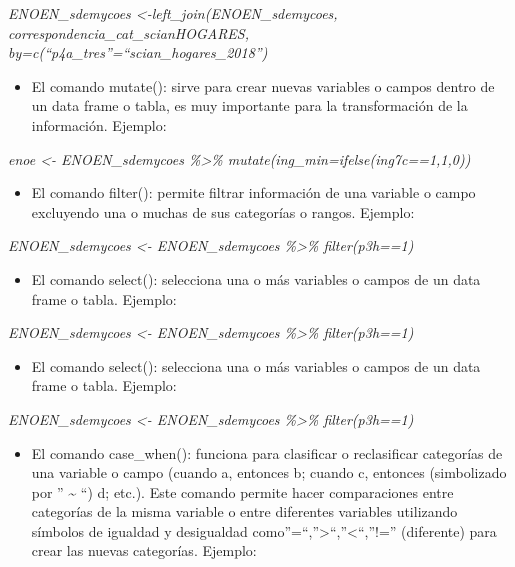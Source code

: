 \documentclass[
]{article}
\providecommand{\tightlist}{%
  \setlength{\itemsep}{0pt}\setlength{\parskip}{0pt}}
\begin{document}
\emph{ENOEN\_sdemycoes \textless-left\_join(ENOEN\_sdemycoes, correspondencia\_cat\_scianHOGARES, by=c(``p4a\_tres''=``scian\_hogares\_2018'')}

\begin{itemize}
\tightlist
\item
  El comando mutate(): sirve para crear nuevas variables o campos dentro de un data frame o tabla, es muy importante para la transformación de la información. Ejemplo:
\end{itemize}

\emph{enoe \textless- ENOEN\_sdemycoes \%\textgreater\% mutate(ing\_min=ifelse(ing7c==1,1,0))}

\begin{itemize}
\tightlist
\item
  El comando filter(): permite filtrar información de una variable o campo excluyendo una o muchas de sus categorías o rangos. Ejemplo:
\end{itemize}

\emph{ENOEN\_sdemycoes \textless- ENOEN\_sdemycoes \%\textgreater\% filter(p3h==1)}

\begin{itemize}
\tightlist
\item
  El comando select(): selecciona una o más variables o campos de un data frame o tabla. Ejemplo:
\end{itemize}

\emph{ENOEN\_sdemycoes \textless- ENOEN\_sdemycoes \%\textgreater\% filter(p3h==1)}

\begin{itemize}
\tightlist
\item
  El comando select(): selecciona una o más variables o campos de un data frame o tabla. Ejemplo:
\end{itemize}

\emph{ENOEN\_sdemycoes \textless- ENOEN\_sdemycoes \%\textgreater\% filter(p3h==1)}

\begin{itemize}
\tightlist
\item
  El comando case\_when(): funciona para clasificar o reclasificar categorías de una variable o campo (cuando a, entonces b; cuando c, entonces (simbolizado por '' \textasciitilde{} ``) d; etc.). Este comando permite hacer comparaciones entre categorías de la misma variable o entre diferentes variables utilizando símbolos de igualdad y desigualdad como''=``,''\textgreater{}``,''\textless{}``,''!='' (diferente) para crear las nuevas categorías. Ejemplo:
\end{itemize}
\end{document}
